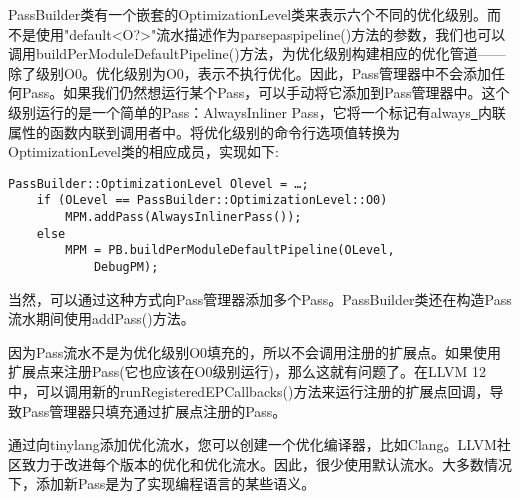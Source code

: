 \begin{enumerate}
PassBuilder类有一个嵌套的OptimizationLevel类来表示六个不同的优化级别。而不是使用"default<O?>"流水描述作为parsepaspipeline()方法的参数，我们也可以调用buildPerModuleDefaultPipeline()方法，为优化级别构建相应的优化管道——除了级别O0。优化级别为O0，表示不执行优化。因此，Pass管理器中不会添加任何Pass。如果我们仍然想运行某个Pass，可以手动将它添加到Pass管理器中。这个级别运行的是一个简单的Pass：AlwaysInliner Pass，它将一个标记有always\underline{~}内联属性的函数内联到调用者中。将优化级别的命令行选项值转换为OptimizationLevel类的相应成员，实现如下:
\begin{lstlisting}[caption={}]
	PassBuilder::OptimizationLevel Olevel = …;
	if (OLevel == PassBuilder::OptimizationLevel::O0)
		MPM.addPass(AlwaysInlinerPass());
	else
		MPM = PB.buildPerModuleDefaultPipeline(OLevel, 
			DebugPM);
\end{lstlisting}

当然，可以通过这种方式向Pass管理器添加多个Pass。PassBuilder类还在构造Pass流水期间使用addPass()方法。\par

\begin{tcolorbox}[colback=blue!5!white,colframe=mymauve!75!black, title=LLVM 12中的新功能——运行扩展点回调]
因为Pass流水不是为优化级别O0填充的，所以不会调用注册的扩展点。如果使用扩展点来注册Pass(它也应该在O0级别运行)，那么这就有问题了。在LLVM 12中，可以调用新的runRegisteredEPCallbacks()方法来运行注册的扩展点回调，导致Pass管理器只填充通过扩展点注册的Pass。
\end{tcolorbox}

\end{enumerate}

通过向tinylang添加优化流水，您可以创建一个优化编译器，比如Clang。LLVM社区致力于改进每个版本的优化和优化流水。因此，很少使用默认流水。大多数情况下，添加新Pass是为了实现编程语言的某些语义。\par




